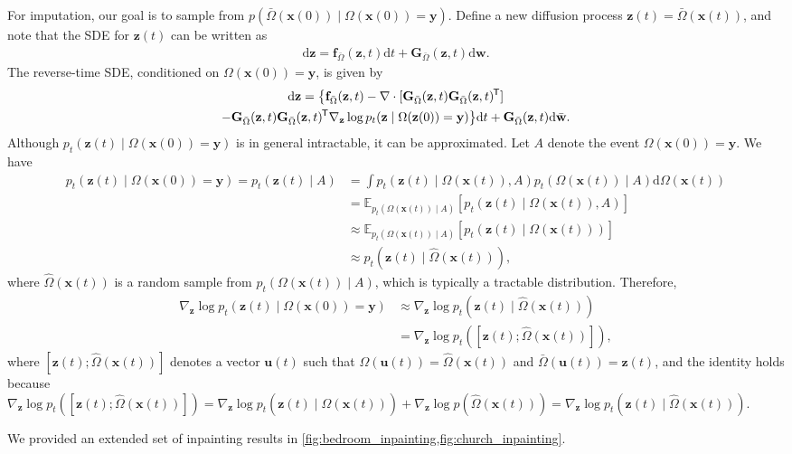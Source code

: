 \documentclass{article} \usepackage{iclr2021_conference,times}
\newcommand*{\tran}{^{\mkern-1.5mu\mathsf{T}}}
\newcommand{\ud}{\mathrm{d}}
\newcommand{\bfx}{\mathbf{x}}
\newcommand{\bfw}{\mathbf{w}}
\newcommand{\bfz}{\mathbf{z}}
\newcommand{\bfu}{\mathbf{u}}
\newcommand{\bff}{\mathbf{f}}
\newcommand{\bfy}{\mathbf{y}}
\newcommand{\bfG}{\mathbf{G}}
\newcommand{\bomega}{{\bar{\Omega}}}
\begin{document}
For imputation, our goal is to sample from $p(\bomega(\bfx(0)) \mid \Omega(\bfx(0)) = \bfy)$. Define a new diffusion process $\bfz(t) = \bomega(\bfx(t))$, and note that the SDE for $\bfz(t)$ can be written as
\begin{align*}
\ud \bfz = \bff_\bomega(\bfz, t) \ud t + \bfG_\bomega(\bfz, t) \ud \bfw.
\end{align*}
The reverse-time SDE, conditioned on $\Omega(\bfx(0)) = \bfy$, is given by
\begin{multline*}
\ud\bfz = \big\{\bff_\bomega(\bfz, t) - \nabla \cdot [\bfG_{\bomega}(\bfz, t) \bfG_{\bomega}(\bfz,t)\tran] \\- \bfG_\bomega(\bfz, t)\bfG_\bomega(\bfz, t)\tran \nabla_\bfz \log p_t(\bfz \mid \Omega(\bfz(0)) = \bfy)\big\}\ud t + \bfG_\bomega(\bfz, t)\ud\bar{\bfw}.
\end{multline*}
Although $p_t(\bfz(t) \mid \Omega(\bfx(0)) = \bfy)$ is in general intractable, it can be approximated. Let $A$ denote the event $\Omega(\bfx(0)) = \bfy $. We have
\begin{align*}
p_t(\bfz(t) \mid \Omega(\bfx(0)) = \bfy) = p_t(\bfz(t) \mid A) &= \int p_t(\bfz(t) \mid \Omega(\bfx(t)), A) p_t(\Omega(\bfx(t)) \mid A) \ud \Omega(\bfx(t)) \\
&= \mathbb{E}_{p_t(\Omega(\bfx(t)) \mid A)}[p_t(\bfz(t) \mid \Omega(\bfx(t)), A)]\\
&\approx \mathbb{E}_{p_t(\Omega(\bfx(t)) \mid A)}[p_t(\bfz(t) \mid \Omega(\bfx(t)))]\\
&\approx p_t(\bfz(t) \mid \hat{\Omega}(\bfx(t))),
\end{align*}
where $\hat{\Omega}(\bfx(t))$ is a random sample from $p_t(\Omega(\bfx(t)) \mid A)$, which is typically a tractable distribution. Therefore,
\begin{align*}
\nabla_\bfz \log p_t(\bfz(t) \mid \Omega(\bfx(0))=\bfy) &\approx \nabla_\bfz \log p_t(\bfz(t) \mid \hat{\Omega}(\bfx(t))) \\
&= \nabla_\bfz \log p_t([\bfz(t); \hat{\Omega}(\bfx(t))]),
\end{align*}
where $[\bfz(t); \hat{\Omega}(\bfx(t))]$ denotes a vector $\bfu(t)$ such that $\Omega(\bfu(t)) = \hat{\Omega}(\bfx(t))$ and $\bar{\Omega}(\bfu(t)) = \bfz(t)$, and the identity holds because $\nabla_\bfz \log p_t([\bfz(t); \hat{\Omega}(\bfx(t))]) = \nabla_\bfz \log p_t(\bfz(t) \mid \hat{\Omega}(\bfx(t))) + \nabla_\bfz \log p(\hat{\Omega}(\bfx(t))) = \nabla_\bfz \log p_t(\bfz(t) \mid \hat{\Omega}(\bfx(t)))$.

We provided an extended set of inpainting results in \cref{fig:bedroom_inpainting,fig:church_inpainting}.
\end{document}
